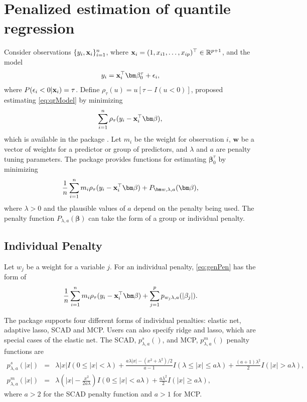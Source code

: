 \section{Penalized estimation of quantile regression}\label{penalized-estimation-of-quantile-regression}

Consider observations \(\{y_i,{\bf x}_i\}_{i=1}^n\), where \({\bf x}_i = (1,x_{i1},\ldots,x_{ip})^\top \in \mathbb{R}^{p+1}\), and the model
\begin{equation}
y_i = {\bf x}_i^\top \bm \beta^{\tau}_0 + \epsilon_i, 
\label{eq:qrModel}
\end{equation}
where \(P(\epsilon_i < 0 | {\bf x}_i)=\tau\). Define \(\rho_\tau(u) = u[\tau-I(u<0)]\), \citet{origQR} proposed estimating \eqref{eq:qrModel} by minimizing
\begin{equation}
\sum_{i=1}^n \rho_\tau(y_i-{\bf x}_i^\top\bm \beta),
\label{eq:qr}
\end{equation}
which is available in the package . Let \(m_i\) be the weight for observation \(i\), \(\bm w\) be a vector of weights for a predictor or group of predictors, and \(\lambda\) and \(a\) are penalty tuning parameters. The package  provides functions for estimating \(\bm \beta^\tau_0\) by minimizing
\begin{equation}
\frac{1}{n} \sum_{i=1}^n m_i \rho_\tau(y_i - {\bf x}_i^\top\bm \beta) + P_{\bm w,\lambda,a}(\bm \beta),
\label{eq:genPen}
\end{equation}
where \(\lambda>0\) and the plausible values of \(a\) depend on the penalty being used. The penalty function \(P_{\lambda,a}(\bm \beta)\) can take the form of a group or individual penalty.

\subsection{Individual Penalty}

Let \(w_j\) be a weight for a variable \(j\). For an individual penalty, \eqref{eq:genPen} has the form of
\begin{equation}
\frac{1}{n} \sum_{i=1}^n m_i \rho_\tau(y_i - {\bf x}_i^\top\bm \beta) + \sum_{j=1}^p p_{w_j\lambda,a}(|\beta_j|).
\label{eq:indPen}
\end{equation}

The package  supports four different forms of individual penalties: elastic net, adaptive lasso, SCAD and MCP. Users can also specify ridge and lasso, which are special cases of the elastic net. The SCAD, \(p^s_{\lambda,a}()\), and MCP, \(p^m_{\lambda,a}()\) penalty functions are
\begin{eqnarray*}
p^s_{\lambda,a}(|x|) &=& \lambda|x|I(0 \leq |x| < \lambda) + \frac{a\lambda|x|-(x^2+\lambda^2)/2}{a-1}I(\lambda \leq |x| \leq a\lambda) + \frac{(a+1)\lambda^2}{2}I(|x|>a\lambda),  \\
p^m_{\lambda,a}(|x|) &=& \lambda\left(|x|-\frac{x^2}{2a\lambda}\right)I(0 \leq |x| < a\lambda) + \frac{a\lambda^2}{2}I(|x|\geq a\lambda),
\end{eqnarray*}
where \(a>2\) for the SCAD penalty function and \(a>1\) for MCP.


